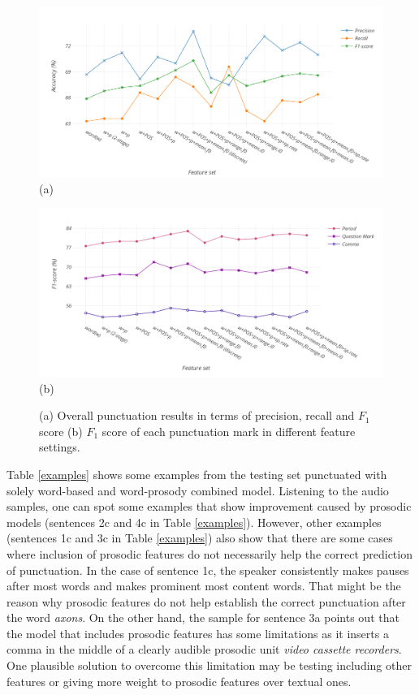 \begin{figure}

    \centering
    \includegraphics[width=\linewidth]{img/csl/overall-punk.png} \\
    (a)

    \par\medskip
    \centering
    \includegraphics[width=\linewidth]{img/csl/each-punk.png}\\
    (b)
    \caption{(a) Overall punctuation results in terms of precision, recall and $F_1$ score (b) $F_1$ score of each punctuation mark in different feature settings.}
    \label{fig:main}
\end{figure}

Table \ref{examples} shows some examples from the testing set punctuated with solely word-based and word-prosody combined model. Listening to the audio samples, one can spot some examples that show improvement caused by prosodic models (sentences 2c and 4c in Table \ref{examples}). 
However, other examples (sentences 1c and 3c in Table \ref{examples}) also show that there are some cases where inclusion of prosodic features do not necessarily help the correct prediction of punctuation. In the case of sentence 1c, the speaker consistently makes pauses after most words and makes prominent most content words. That might be the reason why prosodic features do not help establish the correct punctuation after the word {\it axons}. On the other hand, the sample for sentence 3a points out that the model that includes prosodic features has some limitations as it inserts a comma in the middle of a clearly audible prosodic unit {\it video cassette recorders}. One plausible solution to overcome this limitation may be testing including other features or giving more weight to prosodic features over textual ones.

